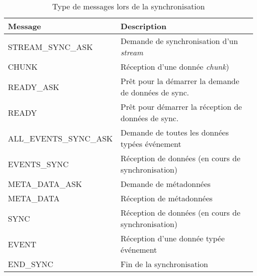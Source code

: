 \begin{table}[h]
	\centering
	\small
	\caption{Type de messages lors de la synchronisation}
	\label{table:messagetype}
	\begin{tabular}{ll}
		\toprule
		\textbf{Message}                & \textbf{Description} \\ \hline
		STREAM\_SYNC\_ASK      &  Demande de synchronisation d'un 
		\textit{stream}           \\
		CHUNK                  &     Réception d'une donnée \textit{chunk})        
		\\
		READY\_ASK             &      Prêt pour la démarrer la demande de 
		données de 
		sync.        \\
		READY                  &       Prêt pour démarrer la réception de 
		données de 
		sync.      \\
		ALL\_EVENTS\_SYNC\_ASK &     Demande de toutes les données 
		typées 
		événement           \\
		EVENTS\_SYNC           &        Réception de données (en cours de 
		synchronisation)       \\
		META\_DATA\_ASK        &     Demande de métadonnées       \\
		META\_DATA             &      Réception de métadonnées       \\
		SYNC                   &      Réception de données (en cours de 
		synchronisation)         \\
		EVENT                  &     Réception d'une donnée typée 
		événement        \\
		END\_SYNC              & Fin de la synchronisation \\ \bottomrule
	\end{tabular}
\end{table}

